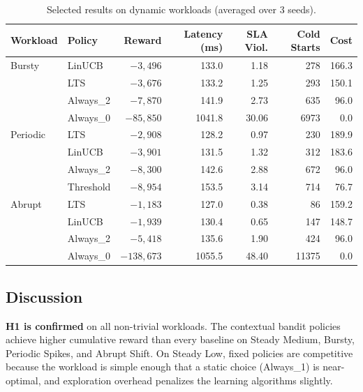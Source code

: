 \documentclass[11pt]{article}
\begin{document}
\begin{table}[H]
\centering
\caption{Selected results on dynamic workloads (averaged over 3 seeds).}
\label{tab:results}
\small
\begin{tabular}{@{}llrrrrr@{}}
\toprule
\textbf{Workload} & \textbf{Policy} & \textbf{Reward} & \textbf{Latency (ms)} & \textbf{SLA Viol.} & \textbf{Cold Starts} & \textbf{Cost} \\
\midrule
Bursty     & LinUCB     & $-3{,}496$   & 133.0 & 1.18  & 278   & 166.3 \\
           & LTS        & $-3{,}676$   & 133.2 & 1.25  & 293   & 150.1 \\
           & Always\_2  & $-7{,}870$   & 141.9 & 2.73  & 635   & 96.0  \\
           & Always\_0  & $-85{,}850$  & 1041.8 & 30.06 & 6973 & 0.0   \\
\midrule
Periodic   & LTS        & $-2{,}908$   & 128.2 & 0.97  & 230   & 189.9 \\
           & LinUCB     & $-3{,}901$   & 131.5 & 1.32  & 312   & 183.6 \\
           & Always\_2  & $-8{,}300$   & 142.6 & 2.88  & 672   & 96.0  \\
           & Threshold  & $-8{,}954$   & 153.5 & 3.14  & 714   & 76.7  \\
\midrule
Abrupt     & LTS        & $-1{,}183$   & 127.0 & 0.38  & 86    & 159.2 \\
           & LinUCB     & $-1{,}939$   & 130.4 & 0.65  & 147   & 148.7 \\
           & Always\_2  & $-5{,}418$   & 135.6 & 1.90  & 424   & 96.0  \\
           & Always\_0  & $-138{,}673$ & 1055.5 & 48.40 & 11375 & 0.0  \\
\bottomrule
\end{tabular}
\end{table}

\subsection{Discussion}

\textbf{H1 is confirmed} on all non-trivial workloads. The contextual bandit policies achieve higher cumulative reward than every baseline on Steady Medium, Bursty, Periodic Spikes, and Abrupt Shift. On Steady Low, fixed policies are competitive because the workload is simple enough that a static choice (Always\_1) is near-optimal, and exploration overhead penalizes the learning algorithms slightly.
\end{document}
